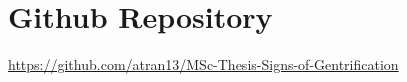 \documentclass[ds, nofrontpicture, nofirstcompanypicture, nosecondcompanypicture]{mscthesis}
\begin{document}
\maketitle

\section*{Github Repository}
\url{https://github.com/atran13/MSc-Thesis-Signs-of-Gentrification}













\newpage

\end{document}
